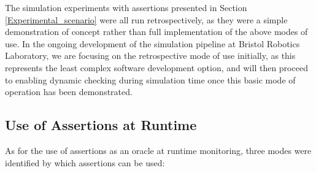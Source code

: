 The simulation experiments with assertions presented in Section \ref{Experimental_scenario} were all run retrospectively, as they were a simple demonstration of concept rather than full implementation of the above modes of use. In the ongoing development of the simulation pipeline at Bristol Robotics Laboratory, we are focusing on the retrospective mode of use initially, as this represents the least complex software development option, and will then proceed to enabling dynamic checking during simulation time once this basic mode of operation has been demonstrated. 


\subsection{Use of Assertions at Runtime} \label{assertions_at_run_time}
As for the use of assertions as an oracle at runtime monitoring, three modes were identified by which assertions can be used: 
